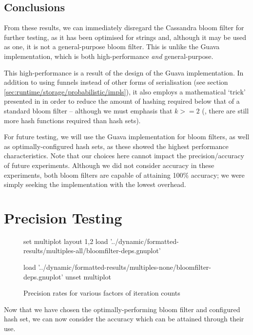 	\subsection{Conclusions} \label{sec:results/bfimpl/conclusions}
	From these results, we can immediately disregard the Cassandra bloom filter for further testing, as it has been optimised for strings and, although it may be used as one, it is not a general-purpose bloom filter. This is unlike the Guava implementation, which is both high-performance \emph{and} general-purpose.
	
	This high-performance is a result of the design of the Guava implementation. In addition to using funnels instead of other forms of serialisation (see section \ref{sec:runtime/storage/probabilistic/impls}), it also employs a mathematical `trick' presented in \citet{Kirsch2006} in order to reduce the amount of hashing required below that of a standard bloom filter -- although we must emphasis that $k >= 2$ (\ie, there are still more hash functions required than hash sets).
	
	For future testing, we will use the Guava implementation for bloom filters, as well as optimally-configured hash sets, as these showed the highest performance characteristics. Note that our choices here cannot impact the precision/accuracy of future experiments. Although we did not consider accuracy in these experiments, both bloom filters are capable of attaining 100\% accuracy; we were simply seeking the implementation with the lowest overhead.
	
\section{Precision Testing} \label{sec:results/precision}

\begin{figure}
	\centering
	\begin{gnuplot}[terminal=pdf]
	set multiplot layout 1,2
		load '../dynamic/formatted-results/multiples-all/bloomfilter-deps.gnuplot'
		
		load '../dynamic/formatted-results/multiples-none/bloomfilter-deps.gnuplot'
	unset multiplot
	\end{gnuplot}
	\caption{Precision rates for various factors of iteration counts}
	\label{chart:precision-factors}
\end{figure}

Now that we have chosen the optimally-performing bloom filter and configured hash set, we can now consider the accuracy which can be attained through their use.

